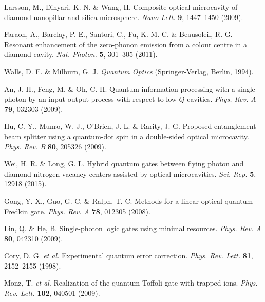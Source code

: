 \documentclass[showpacs,preprintnumbers,showkeys,amsmath,amssymb]{revtex4}%
\begin{document}
\begin{thebibliography}{61}
 Larsson, M.,  Dinyari, K. N. \&  Wang, H. Composite optical microcavity of diamond nanopillar and silica microsphere. \emph{Nano Lett.} \textbf{9}, 1447--1450 (2009).

 Faraon, A.,  Barclay, P. E., Santori, C.,  Fu, K. M. C. \& Beausoleil, R. G. Resonant enhancement of the zero-phonon emission from a colour centre in a diamond cavity. \emph{Nat. Photon.} \textbf{5}, 301--305 (2011).

 Walls, D. F. \&  Milburn, G. J. \emph{Quantum Optics}  (Springer-Verlag, Berlin, 1994).

  An, J. H., Feng,  M. \&  Oh, C. H. Quantum-information processing with a single photon by an input-output process with respect to low-$Q$ cavities. \emph{Phys. Rev. A} \textbf{79}, 032303 (2009).

 Hu, C. Y., Munro, W. J., O'Brien, J. L. \& Rarity, J. G. Proposed entanglement beam splitter using a quantum-dot spin in a double-sided optical microcavity. \emph{Phys. Rev. B} \textbf{80}, 205326 (2009).






 Wei,  H. R. \&  Long, G. L. Hybrid quantum gates between flying photon and diamond nitrogen-vacancy centers assisted by optical microcavities. \emph{Sci. Rep.} \textbf{5}, 12918 (2015).


 Gong, Y. X., Guo, G. C. \&  Ralph, T. C. Methods for a linear optical quantum Fredkin gate. \emph{Phys. Rev. A} \textbf{78}, 012305 (2008).

 Lin, Q. \& He, B. Single-photon logic gates using minimal resources. \emph{Phys. Rev. A} \textbf{80}, 042310 (2009).

 Cory, D. G. \emph{et al.} Experimental quantum error correction. \emph{Phys. Rev. Lett.} \textbf{81}, 2152--2155 (1998).

 Monz, T. \emph{et al}. Realization of the quantum Toffoli gate with trapped ions. \emph{Phys. Rev. Lett.} \textbf{102}, 040501 (2009).


\end{thebibliography}
\end{document}
